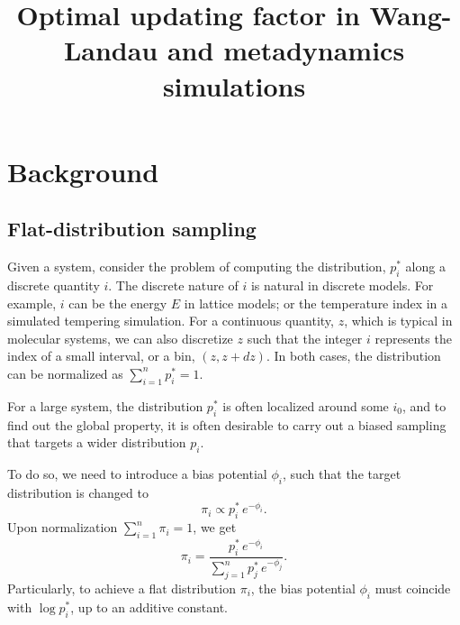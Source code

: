 \documentclass[reprint]{revtex4-1}
\begin{document}
\title{Optimal updating factor in Wang-Landau and metadynamics simulations}

\maketitle


\section{Background}



\subsection{Flat-distribution sampling}



Given a system,
consider the problem of computing
the distribution, $p^*_i$
along a discrete quantity $i$.
%
The discrete nature of $i$ is natural
in discrete models.
%
For example, $i$ can be the energy $E$
in lattice models; or the temperature index
in a simulated tempering simulation.
%
For a continuous quantity, $z$,
which is typical in molecular systems,
we can also discretize $z$
such that the integer $i$ represents
the index of a small interval, or a bin, $(z, z + dz)$.
%
In both cases,
the distribution can be normalized as
$\sum_{i = 1}^n p^*_i = 1$.



For a large system,
the distribution $p^*_i$ is often
localized around some $i_0$,
%
and to find out the global property,
it is often desirable to carry out
a biased sampling that targets
a wider distribution $p_i$.
%



To do so, we need to introduce a bias potential $\phi_i$,
such that the target distribution is changed to
%
\begin{equation}
  \pi_i \propto p^*_i \, e^{-\phi_i}.
  \label{eq:pi_p_phi1}
\end{equation}
%
Upon normalization $\sum_{i = 1}^n \pi_i = 1$,
we get
%
\begin{equation}
  \pi_i =
  \frac{ p^*_i \, e^{-\phi_i} }
  { \sum_{j = 1}^n p^*_j \, e^{-\phi_j} }.
  \label{eq:pi_p_phi}
\end{equation}
%
Particularly,
to achieve a flat distribution $\pi_i$,
the bias potential $\phi_i$
must coincide with $\log p^*_i$,
up to an additive constant.
\end{document}
